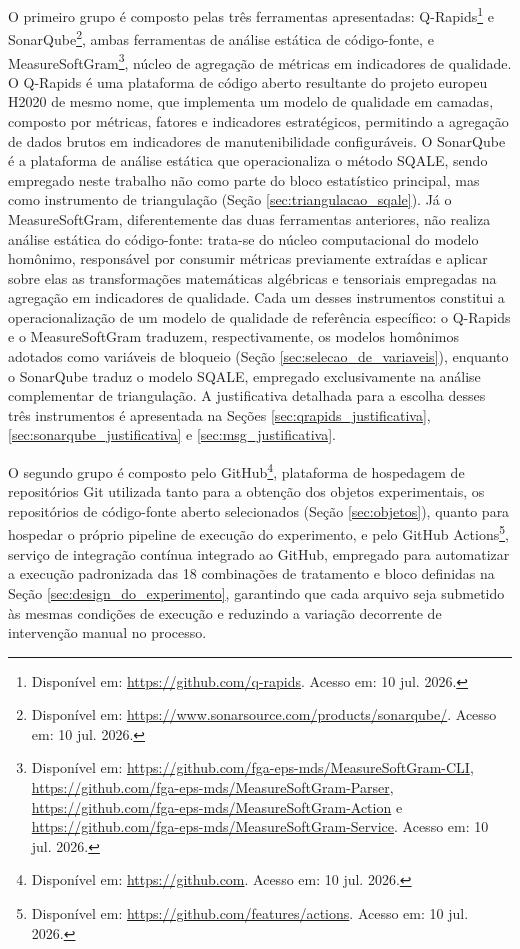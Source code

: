 O primeiro grupo é composto pelas três ferramentas apresentadas: Q-Rapids\footnote{Disponível em: \url{https://github.com/q-rapids}. Acesso em: 10 jul. 2026.} e SonarQube\footnote{Disponível em: \url{https://www.sonarsource.com/products/sonarqube/}. Acesso em: 10 jul. 2026.}, ambas ferramentas de análise estática de código-fonte, e MeasureSoftGram\footnote{Disponível em: \url{https://github.com/fga-eps-mds/MeasureSoftGram-CLI}, \url{https://github.com/fga-eps-mds/MeasureSoftGram-Parser}, \url{https://github.com/fga-eps-mds/MeasureSoftGram-Action} e \url{https://github.com/fga-eps-mds/MeasureSoftGram-Service}. Acesso em: 10 jul. 2026.}, núcleo de agregação de métricas em indicadores de qualidade. O Q-Rapids é uma plataforma de código aberto resultante do projeto europeu H2020 de mesmo nome, que implementa um modelo de qualidade em camadas, composto por métricas, fatores e indicadores estratégicos, permitindo a agregação de dados brutos em indicadores de manutenibilidade configuráveis. O SonarQube é a plataforma de análise estática que operacionaliza o método SQALE, sendo empregado neste trabalho não como parte do bloco estatístico principal, mas como instrumento de triangulação (Seção \ref{sec:triangulacao_sqale}). Já o MeasureSoftGram, diferentemente das duas ferramentas anteriores, não realiza análise estática do código-fonte: trata-se do núcleo computacional do modelo homônimo, responsável por consumir métricas previamente extraídas e aplicar sobre elas as transformações matemáticas algébricas e tensoriais empregadas na agregação em indicadores de qualidade. Cada um desses instrumentos constitui a operacionalização de um modelo de qualidade de referência específico: o Q-Rapids e o MeasureSoftGram traduzem, respectivamente, os modelos homônimos adotados como variáveis de bloqueio (Seção \ref{sec:selecao_de_variaveis}), enquanto o SonarQube traduz o modelo SQALE, empregado exclusivamente na análise complementar de triangulação. A justificativa detalhada para a escolha desses três instrumentos é apresentada na Seções \ref{sec:qrapids_justificativa}, \ref{sec:sonarqube_justificativa} e \ref{sec:msg_justificativa}.

O segundo grupo é composto pelo GitHub\footnote{Disponível em: \url{https://github.com}. Acesso em: 10 jul. 2026.}, plataforma de hospedagem de repositórios Git utilizada tanto para a obtenção dos objetos experimentais, os repositórios de código-fonte aberto selecionados (Seção \ref{sec:objetos}), quanto para hospedar o próprio pipeline de execução do experimento, e pelo GitHub Actions\footnote{Disponível em: \url{https://github.com/features/actions}. Acesso em: 10 jul. 2026.}, serviço de integração contínua integrado ao GitHub, empregado para automatizar a execução padronizada das 18 combinações de tratamento e bloco definidas na Seção \ref{sec:design_do_experimento}, garantindo que cada arquivo seja submetido às mesmas condições de execução e reduzindo a variação decorrente de intervenção manual no processo.

